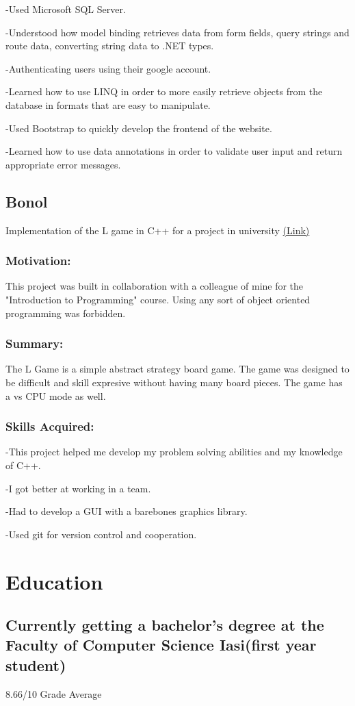 \documentclass[a4paper,hidelinks,12pt]{article}
\begin{document}
-Used Microsoft SQL Server.  

-Understood how model binding retrieves data from form fields, query strings and route data, converting string
data to .NET types.

-Authenticating users using their google account.

-Learned how to use LINQ in order to more easily retrieve objects from the database in formats that are easy
to manipulate.

-Used Bootstrap to quickly develop the frontend of the website.

-Learned how to use data annotations in order to validate user input and return appropriate error messages.


\subsection{Bonol}
Implementation of the L game in C++ for a project in university \href{https://github.com/IureaMarius/ProiectIP}{(Link)}
\subsubsection{Motivation:}
This project was built in collaboration with a colleague of mine for the "Introduction to Programming" course.
Using any sort of object oriented programming was forbidden.
\subsubsection{Summary:}
The L Game is a simple abstract strategy board game. The game was designed to be difficult and skill expresive
without having many board pieces. The game has a vs CPU mode as well.
\subsubsection{Skills Acquired:}
-This project helped me develop my problem solving abilities and my knowledge of C++.

-I got better at working in a team.

-Had to develop a GUI with a barebones graphics library.

-Used git for version control and cooperation.
\section{Education}
\subsection{Currently getting a bachelor's degree at 
the Faculty of Computer Science Iasi(first year student)}
 8.66/10 Grade Average
\end{document}
